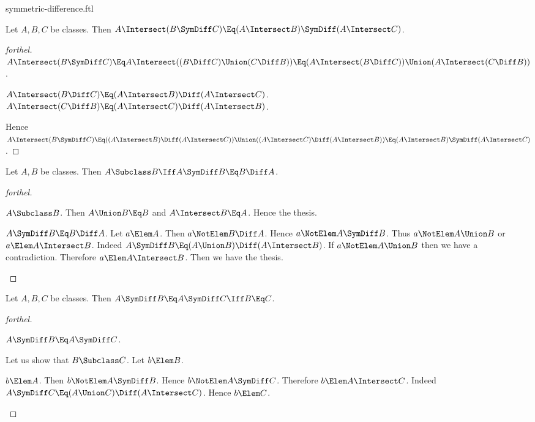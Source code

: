 \documentclass{stex}
\begin{document}
\begin{smodule}{symmetric-difference.ftl}
\begin{proposition*}[forthel]
  Let $A, B, C$ be classes.
  Then $A \Intersect (B \SymDiff C) \Eq (A \Intersect B) \SymDiff (A \Intersect C)$.
\end{proposition*}
\begin{proof}[forthel]
  $A \Intersect (B \SymDiff C)
    \Eq A \Intersect ((B \Diff C) \Union (C \Diff B))
    \Eq (A \Intersect (B \Diff C)) \Union (A \Intersect (C \Diff B))$.

  $A \Intersect (B \Diff C) \Eq (A \Intersect B) \Diff (A \Intersect C)$.
  $A \Intersect (C \Diff B) \Eq (A \Intersect C) \Diff (A \Intersect B)$.

  Hence $A \Intersect (B \SymDiff C)
    \Eq ((A \Intersect B) \Diff (A \Intersect C)) \Union ((A \Intersect C) \Diff (A \Intersect B))
    \Eq (A \Intersect B) \SymDiff (A \Intersect C)$.
\end{proof}

\begin{proposition*}[forthel]
  Let $A, B$ be classes.
  Then $A \Subclass B \Iff A \SymDiff B \Eq B \Diff A$.
\end{proposition*}
\begin{proof}[forthel]
  \begin{case}{$A \Subclass B$.}
    Then $A \Union B \Eq B$ and $A \Intersect B \Eq A$.
    Hence the thesis.
  \end{case}

  \begin{case}{$A \SymDiff B \Eq B \Diff A$.}
    Let $a \Elem A$.
    Then $a \NotElem B \Diff A$.
    Hence $a \NotElem A \SymDiff B$.
    Thus $a \NotElem A \Union B$ or $a \Elem A \Intersect B$.
    Indeed $A \SymDiff B \Eq (A \Union B) \Diff (A \Intersect B)$.
    If $a \NotElem A \Union B$ then we have a contradiction.
    Therefore $a \Elem A \Intersect B$.
    Then we have the thesis.
  \end{case}
\end{proof}

\begin{proposition*}[forthel]
  Let $A, B, C$ be classes.
  Then $A \SymDiff B \Eq A \SymDiff C \Iff B \Eq C$.
\end{proposition*}
\begin{proof}[forthel]
  \begin{case}{$A \SymDiff B \Eq A \SymDiff C$.}

    Let us show that $B \Subclass C$.
      Let $b \Elem B$.

      \begin{case}{$b \Elem A$.}
        Then $b \NotElem A \SymDiff B$.
        Hence $b \NotElem A \SymDiff C$.
        Therefore $b \Elem A \Intersect C$.
        Indeed $A \SymDiff C \Eq (A \Union C) \Diff (A \Intersect C)$.
        Hence $b \Elem C$.
      \end{case}


\end{case}
\end{proof}
\end{smodule}
\end{document}
